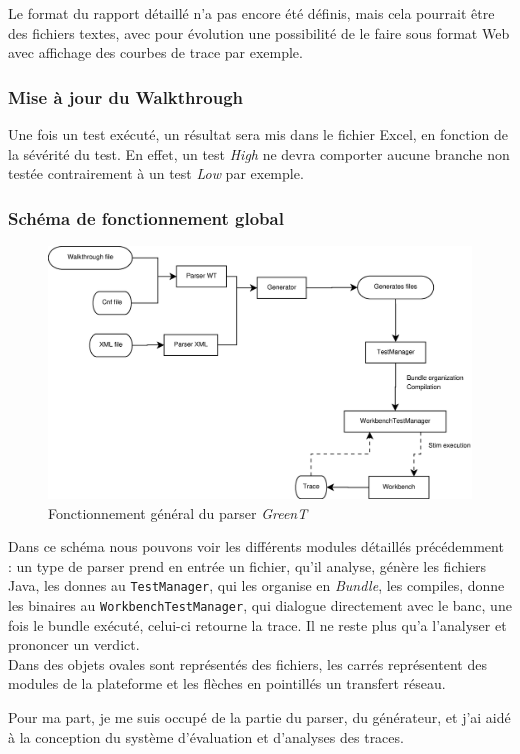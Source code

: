 	Le format du rapport détaillé n'a pas encore été définis, mais cela pourrait être des fichiers textes, avec pour évolution une possibilité de le faire sous format Web avec affichage des courbes de trace par exemple.

	\subsubsection{Mise à jour du Walkthrough}
	Une fois un test exécuté, un résultat sera mis dans le fichier Excel, en fonction de la sévérité du test. En effet, un test \textit{High} ne devra comporter aucune branche non testée contrairement à un test \textit{Low} par exemple.
	
	\subsubsection{Schéma de fonctionnement global}
		\begin{figure}[H]
			\centering
			\includegraphics[width=16.5cm]{contents/images/generalDiag.eps}
			\caption{Fonctionnement général du parser \textit{GreenT}}
			\label{fig:generalDig}
		\end{figure}
		Dans ce schéma nous pouvons voir les différents modules détaillés précédemment : un type de parser prend en entrée un fichier, qu'il analyse, génère les fichiers Java, les donnes au \texttt{TestManager}, qui les organise en \textit{Bundle}, les compiles, donne les binaires au \texttt{WorkbenchTestManager}, qui dialogue directement avec le banc, une fois le bundle exécuté, celui-ci retourne la trace. Il ne reste plus qu'a l'analyser et prononcer un verdict.\\
		Dans des objets ovales sont représentés des fichiers, les carrés représentent des modules de la plateforme et les flèches en pointillés un transfert réseau.

	Pour ma part, je me suis occupé de la partie du parser, du générateur, et j'ai aidé à la conception du système d'évaluation et d'analyses des traces.
